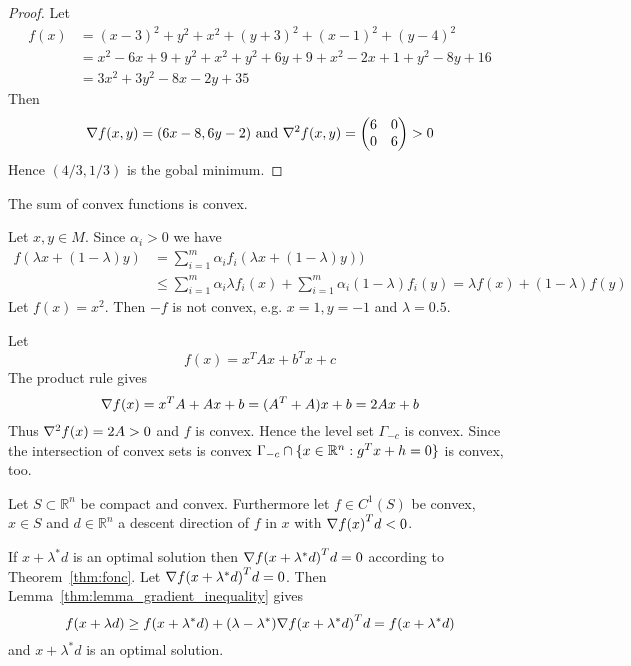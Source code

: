 \begin{proof}
Let 
\[
    \begin{split}
        f(x)    & = {(x - 3)}^2 + y^2 + x^2 + {(y + 3)}^2 + {(x - 1)}^2 + {(y - 4)}^2 \\
                & = x^2 - 6x + 9 + y^2 + x^2 + y^2 + 6y + 9 + x^2 - 2x + 1 + y^2 -8y + 16 \\
                & = 3x^2 + 3y^2 - 8x - 2y + 35
    \end{split}
\]
Then
\[
    \nabla f(x, y) = (6x - 8, 6y - 2) \text{ and } \nabla^2 f(x, y) = 
        \begin{pmatrix}
            6 & 0 \\
            0 & 6 \\
        \end{pmatrix} > 0
\]
Hence \( (4 / 3, 1 / 3) \) is the gobal minimum. 
\end{proof}
\bigskip


The sum of convex functions is convex.

\proof{}
Let \( x, y \in M \). Since \( \alpha_i  > 0 \) we have
\[
    \begin{split}
        f(\lambda x + (1 - \lambda) y) 
            & = \sum_{i=1}^m \alpha_i f_i(\lambda x + (1 - \lambda) y)) \\
            & \le \sum_{i=1}^m \alpha_i \lambda f_i(x) + \sum_{i=1}^m \alpha_i (1 - \lambda) f_i(y) 
                 =  \lambda f(x) + (1 - \lambda) f(y) 
    \end{split}
\]
Let \( f(x) = x^2 \). Then \( -f \) is not convex, e.g. \( x = 1, y = -1 \) and \( \lambda = 0.5 \).
\bigskip


Let 
\[
    f(x) = x^{T}Ax + b^{T}x + c 
\]
\proof{}
The product rule gives 
\[ 
    \nabla {f(x)} = x^{T}A + Ax + b = (A^{T} + A)x + b = 2Ax + b 
\] 
Thus \( \nabla^2 {f(x)} = 2A > 0 \) and \( f \) is convex. Hence the level set \( \Gamma_{-c} \) is convex.
Since the intersection of convex sets is convex \( \Gamma_{-c} \cap \{ x \in \mathbb{R}^n: g^{T}x + h = 0 \} \) is convex, too.
\bigskip


Let \( S \subset \mathbb{R}^n \) be compact and convex. Furthermore let \( f \in C^1(S) \) be convex,
\( x \in S \) and \( d \in \mathbb{R}^n \) a descent direction of \( f \) in \( x \) 
with \( \nabla {f(x)}^T d < 0 \).

\proof{}
If  \( x + \lambda^* d \) is an optimal solution then \( \nabla {f(x + \lambda^* d)}^T d = 0 \) 
according to Theorem~\ref{thm:fonc}.
Let \( \nabla {f(x + \lambda^* d)}^T d = 0 \). Then Lemma~\ref{thm:lemma_gradient_inequality} gives 
\[
    f(x + \lambda d) \ge f(x + \lambda^* d) + (\lambda - \lambda^*) \nabla {f(x + \lambda^* d)}^T d 
        = f(x + \lambda^* d) 
\]
and \( x + \lambda^* d \) is an optimal solution.
\bigskip


